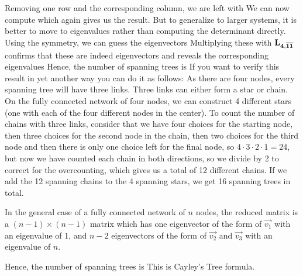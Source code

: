 Removing one row and the corresponding column, we are left with 
We can now compute 
which again gives us the result. But to generalize to larger systems, it is better to move to eigenvalues rather than computing the determinant directly. Using the symmetry, we can guess the eigenvectors 
Multiplying these with ${\bf L_{4,\overline{11}}}$ confirms that these are indeed eigenvectors and reveals the corresponding eigenvalues 
Hence, the number of spanning trees is 
If you want to verify this result in yet another way you can do it as follows: As there are four nodes, every spanning tree will have three links. Three links can either form a star or chain. On the fully connected network of four nodes, we can construct 4 different stars (one with each of the four different nodes in the center). To count the number of chains with three links, consider that we have four choices for the starting node, then three choices for the second node in the chain, then two choices for the third node and then there is only one choice left for the final node, so $4\cdot 3\cdot 2 \cdot 1 = 24$, but now we have counted each chain in both directions, so we divide by 2 to correct for the overcounting, which gives us a total of 12 different chains. If we add the 12 spanning chains to the 4 spanning stars, we get 16 spanning trees in total.

In the general case of a fully connected network of $n$ nodes, the reduced matrix is a $(n-1)\times (n-1)$ matrix which has one eigenvector of the form of $\vec{v_1}$ with an eigenvalue of 1, and $n-2$ eigenvectors of the form of $\vec{v_2}$ and $\vec{v_3}$ with an eigenvalue of $n$. 

Hence, the number of spanning trees is 
This is Cayley's Tree formula. 

